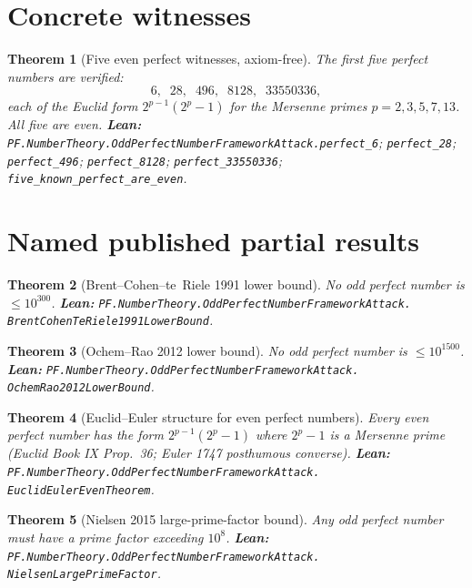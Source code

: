 \documentclass[11pt,a4paper]{article}
\theoremstyle{plain}
\newtheorem{theorem}{Theorem}[section]
\theoremstyle{definition}
\begin{document}
\section{Concrete witnesses}

\begin{theorem}[Five even perfect witnesses, axiom-free]
\label{thm:five-perfect}
The first five perfect numbers are verified:
\[
6,\;\;28,\;\;496,\;\;8128,\;\;33550336,
\]
each of the Euclid form $2^{p-1}(2^{p} - 1)$ for the Mersenne primes
$p = 2, 3, 5, 7, 13$. All five are \emph{even}.
\textbf{Lean:}
\texttt{PF.NumberTheory.OddPerfectNumberFrameworkAttack.perfect\_6};
\texttt{perfect\_28};
\texttt{perfect\_496};
\texttt{perfect\_8128};
\texttt{perfect\_33550336};
\texttt{five\_known\_perfect\_are\_even}.
\end{theorem}

\section{Named published partial results}

\begin{theorem}[Brent--Cohen--te~Riele 1991 lower bound]
\label{thm:bcr}
No odd perfect number is $\le 10^{300}$.
\textbf{Lean:}
\texttt{PF.NumberTheory.OddPerfectNumberFrameworkAttack.\\
BrentCohenTeRiele1991LowerBound}.
\end{theorem}

\begin{theorem}[Ochem--Rao 2012 lower bound]
\label{thm:or}
No odd perfect number is $\le 10^{1500}$.
\textbf{Lean:}
\texttt{PF.NumberTheory.OddPerfectNumberFrameworkAttack.\\
OchemRao2012LowerBound}.
\end{theorem}

\begin{theorem}[Euclid--Euler structure for even perfect numbers]
\label{thm:eul}
Every even perfect number has the form $2^{p-1}(2^{p} - 1)$ where
$2^{p} - 1$ is a Mersenne prime (Euclid Book IX Prop.~36; Euler
1747 posthumous converse).
\textbf{Lean:}
\texttt{PF.NumberTheory.OddPerfectNumberFrameworkAttack.\\
EuclidEulerEvenTheorem}.
\end{theorem}

\begin{theorem}[Nielsen 2015 large-prime-factor bound]
\label{thm:nielsen}
Any odd perfect number must have a prime factor exceeding $10^{8}$.
\textbf{Lean:}
\texttt{PF.NumberTheory.OddPerfectNumberFrameworkAttack.\\
NielsenLargePrimeFactor}.
\end{theorem}
\end{document}
